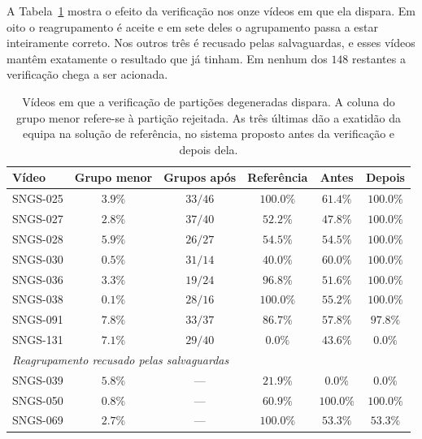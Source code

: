 A Tabela~\ref{tab:regressoes} mostra o efeito da verificação nos onze vídeos em que ela dispara.
Em oito o reagrupamento é aceite e em sete deles o agrupamento passa a estar inteiramente correto.
Nos outros três é recusado pelas salvaguardas, e esses vídeos mantêm exatamente o resultado que já
tinham. Em nenhum dos $148$ restantes a verificação chega a ser acionada.

\begin{table}[htbp]
    \centering
    \caption{Vídeos em que a verificação de partições degeneradas dispara. A coluna do grupo menor
    refere-se à partição rejeitada. As três últimas dão a exatidão da equipa na solução de
    referência, no sistema proposto antes da verificação e depois dela.}
    \label{tab:regressoes}
    \begin{tabular}{|l|c|c|c|c|c|}
        \hline
        \textbf{Vídeo} & \textbf{Grupo menor} & \textbf{Grupos após} & \textbf{Referência} & \textbf{Antes} & \textbf{Depois} \\
        \hline
        SNGS-025 & $3.9\%$ & $33/46$ & $100.0\%$ & $61.4\%$ & $100.0\%$ \\
        \hline
        SNGS-027 & $2.8\%$ & $37/40$ & $52.2\%$ & $47.8\%$ & $100.0\%$ \\
        \hline
        SNGS-028 & $5.9\%$ & $26/27$ & $54.5\%$ & $54.5\%$ & $100.0\%$ \\
        \hline
        SNGS-030 & $0.5\%$ & $31/14$ & $40.0\%$ & $60.0\%$ & $100.0\%$ \\
        \hline
        SNGS-036 & $3.3\%$ & $19/24$ & $96.8\%$ & $51.6\%$ & $100.0\%$ \\
        \hline
        SNGS-038 & $0.1\%$ & $28/16$ & $100.0\%$ & $55.2\%$ & $100.0\%$ \\
        \hline
        SNGS-091 & $7.8\%$ & $33/37$ & $86.7\%$ & $57.8\%$ & $97.8\%$ \\
        \hline
        SNGS-131 & $7.1\%$ & $29/40$ & $0.0\%$ & $43.6\%$ & $0.0\%$ \\
        \hline
        \multicolumn{6}{|l|}{\emph{Reagrupamento recusado pelas salvaguardas}} \\
        \hline
        SNGS-039 & $5.8\%$ & --- & $21.9\%$ & $0.0\%$ & $0.0\%$ \\
        \hline
        SNGS-050 & $0.8\%$ & --- & $60.9\%$ & $100.0\%$ & $100.0\%$ \\
        \hline
        SNGS-069 & $2.7\%$ & --- & $100.0\%$ & $53.3\%$ & $53.3\%$ \\
        \hline
    \end{tabular}
\end{table}

